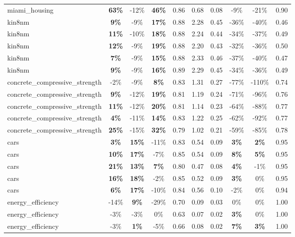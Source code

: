 \begin{table}[!htbp]
\begin{small}
\begin{sc}
{\begin{tabular}{lccccccccc}
miami\_housing & \textbf{63\%} & -12\% & \textbf{46\%} & 0.86 & 0.68 & 0.08 & -9\% & -21\% & 0.90 \\
kin8nm & \textbf{9\%} & -9\% & \textbf{17\%} & 0.88 & 2.28 & 0.45 & -36\% & -40\% & 0.46 \\
kin8nm & \textbf{11\%} & -10\% & \textbf{18\%} & 0.88 & 2.24 & 0.44 & -34\% & -37\% & 0.49 \\
kin8nm & \textbf{12\%} & -9\% & \textbf{19\%} & 0.88 & 2.20 & 0.43 & -32\% & -36\% & 0.50 \\
kin8nm & \textbf{7\%} & -9\% & \textbf{15\%} & 0.88 & 2.33 & 0.46 & -37\% & -40\% & 0.47 \\
kin8nm & \textbf{9\%} & -9\% & \textbf{16\%} & 0.89 & 2.29 & 0.45 & -34\% & -36\% & 0.49 \\
concrete\_compressive\_strength & -2\% & -9\% & \textbf{8\%} & 0.83 & 1.31 & 0.27 & -77\% & -110\% & 0.74 \\
concrete\_compressive\_strength & \textbf{9\%} & -12\% & \textbf{19\%} & 0.81 & 1.19 & 0.24 & -71\% & -96\% & 0.76 \\
concrete\_compressive\_strength & \textbf{11\%} & -12\% & \textbf{20\%} & 0.81 & 1.14 & 0.23 & -64\% & -88\% & 0.77 \\
concrete\_compressive\_strength & \textbf{4\%} & -11\% & \textbf{14\%} & 0.83 & 1.22 & 0.25 & -62\% & -92\% & 0.77 \\
concrete\_compressive\_strength & \textbf{25\%} & -15\% & \textbf{32\%} & 0.79 & 1.02 & 0.21 & -59\% & -85\% & 0.78 \\
cars & \textbf{3\%} & \textbf{15\%} & -11\% & 0.83 & 0.54 & 0.09 & \textbf{3\%} & \textbf{2\%} & 0.95 \\
cars & \textbf{10\%} & \textbf{17\%} & -7\% & 0.85 & 0.54 & 0.09 & \textbf{8\%} & \textbf{5\%} & 0.95 \\
cars & \textbf{21\%} & \textbf{13\%} & \textbf{7\%} & 0.80 & 0.47 & 0.08 & \textbf{4\%} & -1\% & 0.95 \\
cars & \textbf{16\%} & \textbf{18\%} & -2\% & 0.85 & 0.52 & 0.09 & \textbf{3\%} & 0\% & 0.95 \\
cars & \textbf{6\%} & \textbf{17\%} & -10\% & 0.84 & 0.56 & 0.10 & -2\% & 0\% & 0.94 \\
energy\_efficiency & -14\% & \textbf{9\%} & -29\% & 0.70 & 0.09 & 0.03 & 0\% & 0\% & 1.00 \\
energy\_efficiency & -3\% & -3\% & 0\% & 0.63 & 0.07 & 0.02 & \textbf{3\%} & 0\% & 1.00 \\
energy\_efficiency & -3\% & \textbf{1\%} & -5\% & 0.66 & 0.08 & 0.02 & \textbf{7\%} & \textbf{3\%} & 1.00 \\

\end{tabular}}
\end{sc}
\end{small}
\end{table}
